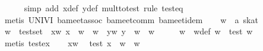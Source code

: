 \begin{isabellebody}
\ \ \ \ \isamarkupfalse%
\ {}simp\ add{}\ x{}{}def\ y{}{}def\ mult{}to{}test{}\ rule\ test{}eq{}\isanewline
\ \ \ \ \isamarkupfalse%
\ {}metis\ UNIV{}I\ ba{}meet{}assoc\ ba{}meet{}comm\ ba{}meet{}idem{}\isanewline
\isanewline
\ \ \isamarkupfalse%
\ w\ {}{}\ {}{}a\ skat{}\isanewline
\ \ \isamarkupfalse%
\ {}w\ {}\ test{}set{}\ \ xw{}\ {}x\ {}\ w\ {}\ w{}\ \ yw{}\ {}y\ {}\ w\ {}\ w{}\isanewline
\ \ \isamarkupfalse%
\ \isamarkupfalse%
\ w{}\ \ w{}{}def{}\ {}w\ {}\ test\ w{}{}\ \isamarkupfalse%
\ {}metis\ test{}ex{}\isanewline
\ \ \isamarkupfalse%
\ xw\ \isamarkupfalse%
\ {}{}test\ x{}{}\ {}\ w\ {}\ w{}\isanewline

\end{isabellebody}
